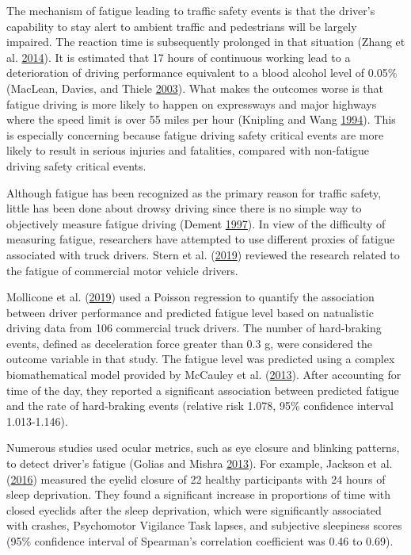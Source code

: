 \documentclass[12pt]{book}
\numberwithin{equation}{chapter}
\begin{document}
The mechanism of fatigue leading to traffic safety events is that the driver's capability to stay alert to ambient traffic and pedestrians will be largely impaired. The reaction time is subsequently prolonged in that situation (Zhang et al. \protect\hyperlink{ref-zhang2014study}{2014}). It is estimated that 17 hours of continuous working lead to a deterioration of driving performance equivalent to a blood alcohol level of 0.05\% (MacLean, Davies, and Thiele \protect\hyperlink{ref-maclean2003hazards}{2003}). What makes the outcomes worse is that fatigue driving is more likely to happen on expressways and major highways where the speed limit is over 55 miles per hour (Knipling and Wang \protect\hyperlink{ref-knipling1994crashes}{1994}). This is especially concerning because fatigue driving safety critical events are more likely to result in serious injuries and fatalities, compared with non-fatigue driving safety critical events.

Although fatigue has been recognized as the primary reason for traffic safety, little has been done about drowsy driving since there is no simple way to objectively measure fatigue driving (Dement \protect\hyperlink{ref-dement1997perils}{1997}). In view of the difficulty of measuring fatigue, researchers have attempted to use different proxies of fatigue associated with truck drivers. Stern et al. (\protect\hyperlink{ref-stern2019data}{2019}) reviewed the research related to the fatigue of commercial motor vehicle drivers.

Mollicone et al. (\protect\hyperlink{ref-mollicone2019predicting}{2019}) used a Poisson regression to quantify the association between driver performance and predicted fatigue level based on natualistic driving data from 106 commercial truck drivers. The number of hard-braking events, defined as deceleration force greater than 0.3 g, were considered the outcome variable in that study. The fatigue level was predicted using a complex biomathematical model provided by McCauley et al. (\protect\hyperlink{ref-mccauley2013dynamic}{2013}). After accounting for time of the day, they reported a significant association between predicted fatigue and the rate of hard-braking events (relative risk 1.078, 95\% confidence interval 1.013-1.146).

Numerous studies used ocular metrics, such as eye closure and blinking patterns, to detect driver's fatigue (Golias and Mishra \protect\hyperlink{ref-golias2013evaluating}{2013}). For example, Jackson et al. (\protect\hyperlink{ref-jackson2016utility}{2016}) measured the eyelid closure of 22 healthy participants with 24 hours of sleep deprivation. They found a significant increase in proportions of time with closed eyeclids after the sleep deprivation, which were significantly associated with crashes, Psychomotor Vigilance Task lapses, and subjective sleepiness scores (95\% confidence interval of Spearman's correlation coefficient was 0.46 to 0.69).
\end{document}
